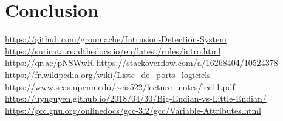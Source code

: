 \documentclass[a4paper]{article}
\begin{document}
\section{Conclusion}


















\newpage \tableofcontents \listoffigures
\begin{thebibliography}{9}
 {\small \url{https://github.com/groumache/Intrusion-Detection-System}}
 {\small \url{https://suricata.readthedocs.io/en/latest/rules/intro.html}}
 {\small \url{https://qr.ae/pNSWwR}}
 {\small \url{https://stackoverflow.com/a/16268404/10524378}}
 {\small \url{https://fr.wikipedia.org/wiki/Liste_de_ports_logiciels}}
 {\small \url{https://www.seas.upenn.edu/~cis522/lecture_notes/lec11.pdf}}
 {\small \url{https://uynguyen.github.io/2018/04/30/Big-Endian-vs-Little-Endian/}}
 {\small \url{https://gcc.gnu.org/onlinedocs/gcc-3.2/gcc/Variable-Attributes.html}}
\end{thebibliography}
\end{document}
